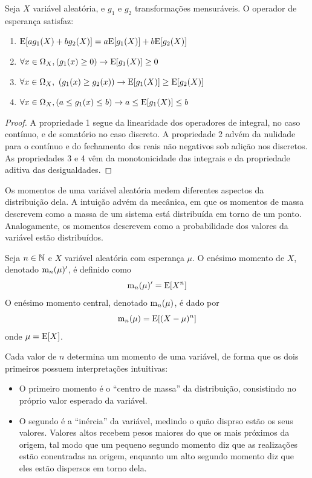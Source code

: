 \begin{thm:propriedades esperanca}
\label{thm:propriedades esperanca}
Seja $X$ variável aleatória, e $g_1$ e $g_2$ transformações mensuráveis.
O operador de esperança satisfaz:
\begin{enumerate}
	\item $\mathrm{E}\!\left[ag_1(X) + bg_2(X)\right] = a \mathrm{E}\!\left[g_1(X)\right] + b \mathrm{E}\!\left[g_2(X)\right]$
	\item $\forall x \in \Omega_X, (g_1(x) \ge 0) \rightarrow \mathrm{E}\!\left[g_1(X)\right] \ge 0$
	\item $\forall x \in \Omega_X,\ (g_1(x) \ge g_2(x)) \rightarrow \mathrm{E}\!\left[g_1(X)\right] \ge \mathrm{E}\!\left[g_2(X)\right]$
	\item $\forall x \in \Omega_X, (a \le g_1(x) \le b) \rightarrow a \le \mathrm{E}\!\left[g_1(X)\right] \le b$
\end{enumerate}
\begin{proof}
	A propriedade 1 segue da linearidade dos operadores de integral, no caso contínuo, e
	de somatório no caso discreto.
	A propriedade 2 advém da nulidade para o contínuo e  do fechamento dos reais não
	negativos sob adição nos discretos.
	As propriedades 3 e 4 vêm da monotonicidade das integrais e da propriedade aditiva das
	desigualdades.
\end{proof}
\end{thm:propriedades esperanca}

Os momentos de uma variável aleatória medem diferentes aspectos da distribuição dela.
A intuição advém da mecânica, em que os momentos de massa descrevem como a massa
de um sistema está distribuída em torno de um ponto.
Analogamente, os momentos descrevem como a probabilidade dos valores da variável estão
distribuídos.

\begin{def:momento}
\label{def:momento}
Seja $n \in \mathbb{N}$ e $X$ variável aleatória com esperança $\mu$.
O enésimo momento de $X$, denotado $\mathrm{m}_n(\mu)'$, é definido como
\[
	\mathrm{m}_n(\mu)' = \mathrm{E}\!\left[X^n\right]
\]
O enésimo momento central, denotado $\mathrm{m}_n(\mu)$, é dado por
\[
	\mathrm{m}_n(\mu) = \mathrm{E}\!\left[(X - \mu)^n\right]
\]
onde $\mu = \mathrm{E}\!\left[X\right]$.
\end{def:momento}

Cada valor de $n$ determina um momento de uma variável, de forma que os dois primeiros
possuem interpretações intuitivas:
\begin{itemize}
\item O primeiro momento é o ``centro de massa'' da distribuição, consistindo no próprio
valor esperado da variável.

\item O segundo é a ``inércia'' da variável, medindo o quão disprso estão os seus valores.
Valores altos recebem pesos maiores do que os mais próximos da origem, tal modo que
um pequeno segundo momento diz que as realizações estão conentradas na origem, enquanto
um alto segundo momento diz que eles estão dispersos em torno dela.
\end{itemize}


